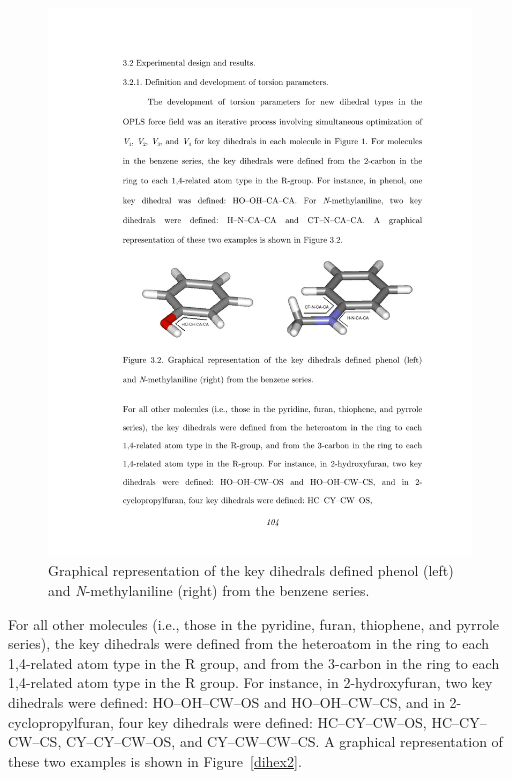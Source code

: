 \documentclass[12pt]{report}
\def\figlab{Figure}\def\figslab{\figlab s}
\newcommand*\fig[1]{\figlab~\ref{#1}}
\begin{document}
\begin{figure}[ht]
\centering
\includegraphics[scale=0.999]{figures/pdf/dihex.pdf}
\caption{Graphical representation of the key dihedrals defined phenol (left) and \textit{N}-methylaniline (right) from the benzene series.}
\label{dihex}
\end{figure}

For all other molecules (i.e., those in the pyridine, furan, thiophene, and pyrrole series), the key dihedrals were defined from the heteroatom in the ring to each 1,4-related atom type in the R group, and from the 3-carbon in the ring to each 1,4-related atom type in the R group. For instance, in 2-hydroxyfuran, two key dihedrals were defined: HO--OH--CW--OS and HO--OH--CW--CS, and in 2-cyclopropylfuran, four key dihedrals were defined: 
HC--CY--CW--OS, HC--CY--CW--CS, CY--CY--CW--OS, and CY--CW--CW--CS. A graphical representation of these two examples is shown in \fig{dihex2}. 
\end{document}
